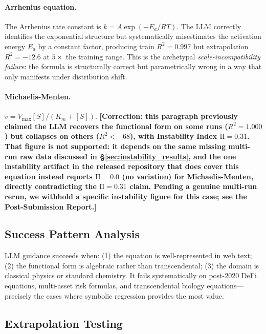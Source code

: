 \documentclass[twoside,11pt]{article}
\newcommand{\Rsq}{R^{2}}
\newcommand{\II}{\mathrm{II}}
\begin{document}
\paragraph{Arrhenius equation.}
The Arrhenius rate constant is $k = A \exp\!(-E_a/RT)$. The LLM correctly identifies the exponential structure but systematically misestimates the activation energy $E_a$ by a constant factor, producing train $\Rsq = 0.997$ but extrapolation $\Rsq = -12.6$ at $5\times$ the training range. This is the archetypal \emph{scale-incompatibility failure}: the formula is structurally correct but parametrically wrong in a way that only manifests under distribution shift.

\paragraph{Michaelis-Menten.}
$v = V_{\max}[S]/(K_m + [S])$. \textbf{[Correction: this paragraph previously
claimed the LLM recovers the functional form on some runs ($\Rsq = 1.000$)
but collapses on others ($\Rsq < -68$), with Instability Index $\II = 0.31$.
That figure is not supported: it depends on the same missing multi-run raw
data discussed in \S\ref{sec:instability_results}, and the one instability
artifact in the released repository that does cover this equation instead
reports $\II = 0.0$ (no variation) for Michaelis-Menten, directly
contradicting the $\II=0.31$ claim. Pending a genuine multi-run rerun, we
withhold a specific instability figure for this case; see the Post-Submission
Report.]}

\subsection{Success Pattern Analysis}\label{subsec:success-pattern-analysis}
\label{sec:llm_success}

LLM guidance succeeds when: (1) the equation is well-represented in web text; (2) the functional form is algebraic rather than transcendental; (3) the domain is classical physics or standard chemistry. It fails systematically on post-2020 DeFi equations, multi-asset risk formulas, and transcendental biology equations---precisely the cases where symbolic regression provides the most value.

\subsection{Extrapolation Testing}\label{subsec:extrapolation-testing}
\label{sec:llm_extrap}
\end{document}
